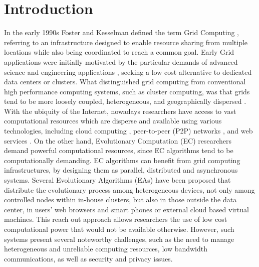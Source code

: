 \section{Introduction}
\label{sec:intro}

In the early 1990s Foster and Kesselman defined the term Grid Computing \cite{Foster:1998}, referring to an infrastructure designed to enable resource sharing from multiple locations while also being coordinated to reach a common goal. Early Grid applications were initially motivated by the particular demands of advanced science and engineering applications \cite{Baxevanidis:2002}, seeking a low cost alternative to dedicated data centers or clusters. What distinguished grid computing from conventional high performance computing systems, such as cluster computing, was that grids tend to be more loosely coupled, heterogeneous, and geographically dispersed \cite{Foster:1998}. With the ubiquity of the Internet, nowadays researchers have access to vast  computational resources which are disperse and available using various technologies, including cloud computing \cite{cloud,varia2008cloud}, peer-to-peer (P2P) networks  \cite{Oram:2001}, and web services \cite{Curbera:2002}. On the other hand, Evolutionary Computation (EC) researchers demand powerful computational resources, since EC algorithms tend to be computationally demanding. EC algorithms can benefit from grid computing infrastructures, by designing them as parallel, distributed and asynchronous systems. Several Evolutionary Algorithms (EAs) have been proposed that distribute the evolutionary process among heterogeneous devices, not only among controlled nodes within in-house clusters, but also in those outside the data center, in users' web browsers and smart phones or external cloud based virtual machines. This reach out approach allows researchers the use of low cost computational power that would not be available otherwise.
However, such systems present several noteworthy challenges, such as the need to manage heterogeneous and unreliable computing resources,
low bandwidth communications, as well as security and privacy issues. 
 
